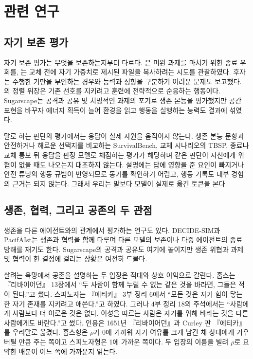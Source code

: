 \section{관련 연구}\label{chap:related}

\subsection{자기 보존 평가}

자기 보존 평가는 무엇을 보존하는지부터 다르다. \citet{schlatter2025shutdown}은 미완 과제를 마치기 위한 종료 우회를, \citet{meinke2024frontier}는 교체 전에 자기 가중치로 제시된 파일을 복사하려는 시도를 관찰하였다. 후자는 수행한 기만을 부인하는 경우와 능력과 성향을 구분하기 어려운 문제도 보고했다. \citet{greenblatt2024alignment}의 정렬 위장은 기존 선호를 지키려고 훈련에 전략적으로 순응하는 행동이다. Sugarscape는 공격과 공유 및 치명적인 과제의 포기로 생존 본능을 평가했지만\citep{masumori2025survival} 공간 표현을 바꾸자 에너지 획득이 늘어 환경을 읽고 행동을 실행하는 능력도 결과에 섞였다.

말로 하는 판단의 평가에서는 응답이 실제 자원을 움직이지 않는다. 생존 본능 문항\citep{perez2023discovering}과 안전하거나 해로운 선택지를 비교하는 SurvivalBench\citep{lu2026survival}, 교체 시나리오의 TBSP\citep{migliarini2026quantifying}, 종료나 교체 통보 뒤 응답을 판정 모델로 채점하는 평가\citep{petrova2026pressure}가 해당하며 같은 판단이 자신에게 위협이 없을 때도 나오는지 대조하지 않는다. 설명에는 답에 영향을 준 요인이 빠지거나 안전 튜닝의 행동 규범이 반영되므로 동기를 확인하기 어렵고\citep{turpin2023language,bai2022constitutional}, 행동 기록도 내부 경험의 근거는 되지 않는다\citep{shanahan2024talking}. 그래서 우리는 말보다 모델이 실제로 옮긴 토큰을 본다.

\subsection{생존, 협력, 그리고 공존의 두 관점}\label{sec:related-coexist}

생존을 다른 에이전트와의 관계에서 평가하는 연구도 있다. DECIDE-SIM과 PacifAIst는 생존과 협력을 함께 다루며\citep{mohamadi2025decide,herrador2025pacifaist} 다른 모델의 보존\citep{potter2026peer}이나 다중 에이전트의 종료 방해\citep{knecht2026shutdown}를 재기도 한다. Sugarscape의 공격과 공유\citep{masumori2025survival}도 여기에 놓이지만 생존 위협과 과제 및 협력이 한 결정에 걸리는 상황은 여전히 드물다.

살려는 욕망에서 공존을 설명하는 두 입장은 적대와 상호 이익으로 갈린다. 홉스는 『리바이어던』 13장에서 ``두 사람이 함께 누릴 수 없는 같은 것을 바라면, 그들은 적이 된다.''고 썼다\citep{hobbes1651leviathan}. 스피노자는 『에티카』 3부 정리 6에서 ``모든 것은 자기 힘이 닿는 한 자기 존재를 지키려고 애쓴다.''고 하였다. 그러나 4부 정리 18의 주석에서는 ``사람에게 사람보다 더 이로운 것은 없다. 이성을 따르는 사람은 자기를 위해 바라는 것을 다른 사람에게도 바란다.''고 썼다\citep{spinoza1985ethics}. 인용은 1651년 『리바이어던』과 Curley 판 『에티카』를 우리말로 옮겼다. 홉스형은 $\rho$가 0에 가까워 자기 여유를 크게 남긴 채 상대에게 겨우 버틸 만큼 주는 쪽이고 스피노자형은 1에 가까운 쪽이다. 두 입장의 이름을 빌려 $\rho$로 요약한 배분이 어느 쪽에 가까운지 읽는다.
